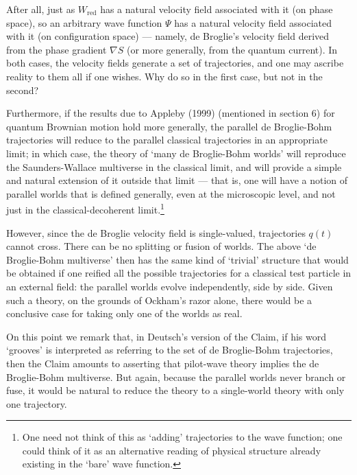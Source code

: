 \documentclass{article}%
\begin{document}
After all, just as $W_{\mathrm{red}}$ has a natural velocity field associated
with it (on phase space), so an arbitrary wave function $\Psi$ has a natural
velocity field associated with it (on configuration space) --- namely, de
Broglie's velocity field derived from the phase gradient $\nabla S$ (or more
generally, from the quantum current). In both cases, the velocity fields
generate a set of trajectories, and one may ascribe reality to them all if one
wishes. Why do so in the first case, but not in the second?

Furthermore, if the results due to Appleby (1999) (mentioned in section 6) for
quantum Brownian motion hold more generally, the parallel de Broglie-Bohm
trajectories will reduce to the parallel classical trajectories in an
appropriate limit; in which case, the theory of `many de Broglie-Bohm worlds'
will reproduce the Saunders-Wallace multiverse in the classical limit, and
will provide a simple and natural extension of it outside that limit --- that
is, one will have a notion of parallel worlds that is defined generally, even
at the microscopic level, and not just in the classical-decoherent
limit.\footnote{One need not think of this as `adding' trajectories to the
wave function; one could think of it as an alternative reading of physical
structure already existing in the `bare' wave function.}

However, since the de Broglie velocity field is single-valued, trajectories
$q(t)$ cannot cross. There can be no splitting or fusion of worlds. The above
`de Broglie-Bohm multiverse' then has the same kind of `trivial' structure
that would be obtained if one reified all the possible trajectories for a
classical test particle in an external field: the parallel worlds evolve
independently, side by side. Given such a theory, on the grounds of Ockham's
razor alone, there would be a conclusive case for taking only one of the
worlds as real.

On this point we remark that, in Deutsch's version of the Claim, if his word
`grooves' is interpreted as referring to the set of de Broglie-Bohm
trajectories, then the Claim amounts to asserting that pilot-wave theory
implies the de Broglie-Bohm multiverse. But again, because the parallel worlds
never branch or fuse, it would be natural to reduce the theory to a
single-world theory with only one trajectory.
\end{document}
